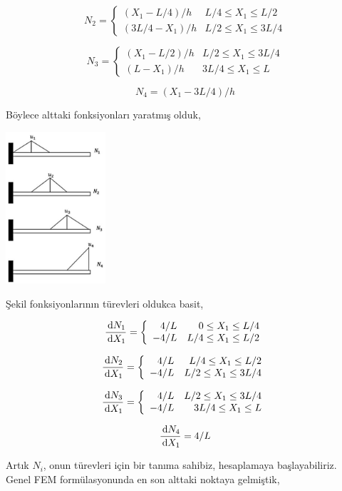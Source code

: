 \documentclass[12pt,fleqn]{article}\usepackage{../../common}
\begin{document}
$$
N_2 = \left\{ \begin{array}{rr}
(X_1 - L/4)/h & L/4 \le X_1 \le L/2 \\
(3L/4 - X_1)/h & L/2 \le X_1 \le 3L/4
\end{array} \right.
$$

$$
N_3 = \left\{ \begin{array}{rr}
(X_1-L/2)/h & L/2 \le X_1 \le 3L/4 \\
(L-X_1)/h & 3L/4 \le X_1 \le L
\end{array} \right.
$$

$$
N_4 = (X_1 - 3L/4) / h
$$

Böylece alttaki fonksiyonları yaratmış olduk,

\includegraphics[width=10em]{compscieng_bpp45fem2_11.jpg}

Şekil fonksiyonlarının türevleri oldukca basit,

$$
\frac{\,\mathrm{d} N_1}{\,\mathrm{d} X_1} = \left\{ \begin{array}{rr}
4/L   & 0 \le X_1 \le L/4 \\
-4/L  & L/4 \le X_1 \le L/2
\end{array} \right.
$$

$$
\frac{\,\mathrm{d} N_2}{\,\mathrm{d} X_1} = \left\{ \begin{array}{rr}
4/L  & L/4 \le X_1 \le L/2 \\
-4/L & L/2 \le X_1 \le 3L/4
\end{array} \right.
$$

$$
\frac{\,\mathrm{d} N_3}{\,\mathrm{d} X_1} = \left\{ \begin{array}{rr}
4/L  & L/2 \le X_1 \le 3L/4 \\
-4/L & 3L/4 \le X_1 \le L
\end{array} \right.
$$

$$
\frac{\,\mathrm{d} N_4}{\,\mathrm{d} X_1} = 4/L
$$

Artık $N_i$, onun türevleri için bir tanıma sahibiz, hesaplamaya
başlayabiliriz. Genel FEM formülasyonunda en son alttaki noktaya gelmiştik,
\end{document}
